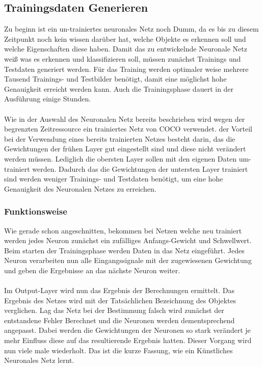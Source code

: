 \documentclass[a4paper,12pt,oneside]{article}
\begin{document}
  \subsection{Trainingsdaten Generieren} 
Zu beginn ist ein un-trainiertes neuronales Netz noch \grqq Dumm\grqq , da es bis zu diesem Zeitpunkt noch kein wissen darüber hat, welche Objekte es erkennen soll und welche Eigenschaften diese haben. Damit das zu entwickelnde Neuronale Netz weiß was es erkennen und klassifizieren soll, müssen zunächst Trainings und Testdaten generiert werden. Für das Training werden optimaler weise mehrere Tausend Trainings- und Testbilder benötigt, damit eine möglichst hohe Genauigkeit erreicht werden kann. Auch die Trainingsphase dauert in der Ausführung einige Stunden. 
\\
\\
Wie in der Auswahl des Neuronalen Netz bereits beschrieben wird wegen der begrenzten Zeitressource ein trainiertes Netz von COCO verwendet. der Vorteil bei der Verwendung eines bereits trainierten Netzes besteht darin, das die Gewichtungen der frühen Layer gut eingestellt sind und diese nicht verändert werden müssen. Lediglich die obersten Layer sollen mit den eigenen Daten um-trainiert werden. Dadurch das die Gewichtungen der untersten Layer trainiert sind werden weniger Trainings- und Testdaten benötigt, um eine hohe Genauigkeit des Neuronalen Netzes zu erreichen.

  \subsubsection{Funktionsweise}
Wie gerade schon angeschnitten, bekommen bei Netzen welche neu trainiert werden jedes Neuron zunächst ein zufälliges Anfangs-Gewicht und Schwellwert. Beim starten der Trainingsphase werden Daten in das Netz eingeführt. Jedes Neuron verarbeiten nun alle Eingangssignale mit der zugewiesenen Gewichtung und geben die Ergebnisse an das nächste Neuron weiter. 
\\
\\
Im Output-Layer wird nun das Ergebnis der Berechnungen ermittelt. Das Ergebnis des Netzes wird mit der Tatsächlichen Bezeichnung des Objektes verglichen. Lag das Netz bei der Bestimmung falsch wird zunächst der entstandene Fehler Berechnet und die Neuronen werden dementsprechend angepasst. Dabei werden die Gewichtungen der Neuronen so stark verändert je mehr Einfluss diese auf das resultierende Ergebnis hatten. Dieser Vorgang wird nun viele male wiederholt. Das ist die kurze Fassung, wie ein Künstliches Neuronales Netz lernt. 
  
\end{document}
